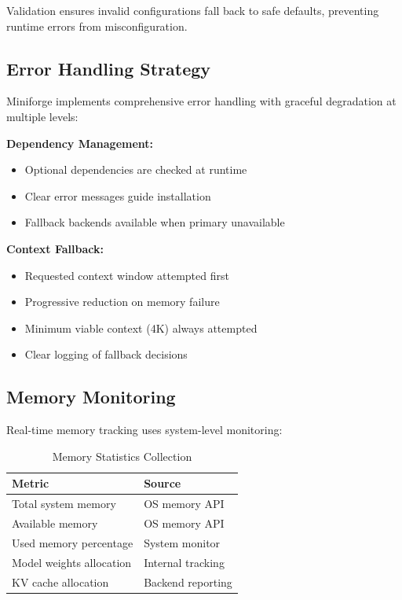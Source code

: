 Validation ensures invalid configurations fall back to safe defaults, preventing runtime errors from misconfiguration.

\subsection{Error Handling Strategy}

Miniforge implements comprehensive error handling with graceful degradation at multiple levels:

\textbf{Dependency Management:}
\begin{itemize}
    \item Optional dependencies are checked at runtime
    \item Clear error messages guide installation
    \item Fallback backends available when primary unavailable
\end{itemize}

\textbf{Context Fallback:}
\begin{itemize}
    \item Requested context window attempted first
    \item Progressive reduction on memory failure
    \item Minimum viable context (4K) always attempted
    \item Clear logging of fallback decisions
\end{itemize}

\subsection{Memory Monitoring}

Real-time memory tracking uses system-level monitoring:

\begin{table}[h]
\centering
\caption{Memory Statistics Collection}
\label{tab:memory_stats}
\begin{tabular}{ll}
\toprule
\textbf{Metric} & \textbf{Source} \\
\midrule
Total system memory & OS memory API \\
Available memory & OS memory API \\
Used memory percentage & System monitor \\
Model weights allocation & Internal tracking \\
KV cache allocation & Backend reporting \\
\bottomrule
\end{tabular}
\end{table}

